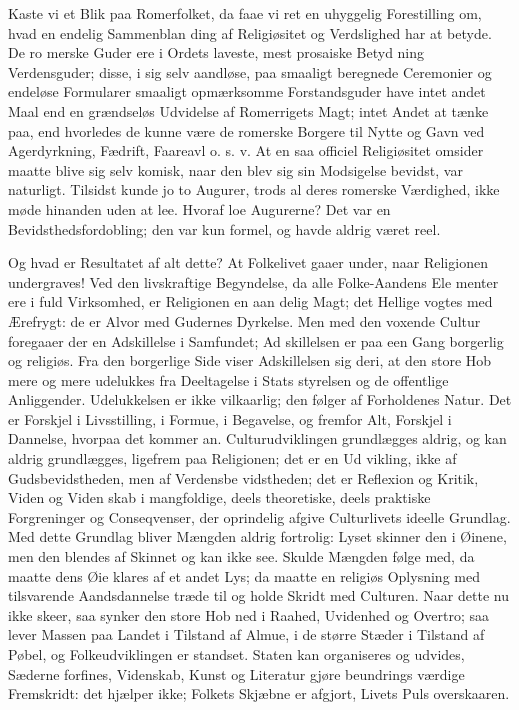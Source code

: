 \documentclass[12pt]{book}
\newcommand{\opage}[1]{\marginnote{\footnotesize\textit{[#1]}}}
\begin{document}
Kaste vi et Blik paa Romerfolket, da faae vi ret en
uhyggelig Forestilling om, hvad en endelig Sammenblan\-%
ding af Religiøsitet og Verdslighed har at betyde. De ro\-%
merske Guder ere i Ordets laveste, mest prosaiske Betyd\-%
ning Verdensguder; disse, i sig selv aandløse, paa smaaligt
beregnede Ceremonier og endeløse Formularer smaaligt
opmærksomme Forstandsguder have intet andet Maal
end en grændseløs Udvidelse af Romerrigets Magt; intet
Andet at tænke paa, end hvorledes de kunne være de
romerske Borgere til Nytte og Gavn ved Agerdyrkning,
Fædrift, Faareavl o. s. v. At en saa officiel Religiøsitet
omsider maatte blive sig selv komisk, naar den blev sig
sin Modsigelse bevidst, var naturligt. Tilsidst kunde jo
to Augurer, trods al deres romerske Værdighed, ikke
møde hinanden uden at lee. Hvoraf loe Augurerne?
Det var en Bevidsthedsfordobling; den var kun formel,
og havde aldrig været reel.

Og hvad er Resultatet af alt dette? At Folkelivet
gaaer under, naar Religionen undergraves! Ved den
livskraftige Begyndelse, da alle Folke-Aandens Ele\-%
menter ere i fuld Virksomhed, er Religionen en aan\-%
\opage{51}\setcounter{footnote}{0}%
delig Magt; det Hellige vogtes med Ærefrygt: de
er Alvor med Gudernes Dyrkelse. Men med den voxende
Cultur foregaaer der en Adskillelse i Samfundet; Ad\-%
skillelsen er paa een Gang borgerlig og religiøs. Fra den
borgerlige Side viser Adskillelsen sig deri, at den store
Hob mere og mere udelukkes fra Deeltagelse i Stats\-%
styrelsen og de offentlige Anliggender. Udelukkelsen er
ikke vilkaarlig; den følger af Forholdenes Natur. Det
er Forskjel i Livsstilling, i Formue, i Begavelse, og
fremfor Alt, Forskjel i Dannelse, hvorpaa det kommer
an. Culturudviklingen grundlægges aldrig, og kan aldrig
grundlægges, ligefrem paa Religionen; det er en Ud\-%
vikling, ikke af Gudsbevidstheden, men af Verdensbe\-%
vidstheden; det er Reflexion og Kritik, Viden og Viden\-%
skab i mangfoldige, deels theoretiske, deels praktiske
Forgreninger og Conseqvenser, der oprindelig afgive
Culturlivets ideelle Grundlag. Med dette Grundlag
bliver Mængden aldrig fortrolig: Lyset skinner den i
Øinene, men den blendes af Skinnet og kan ikke see.
Skulde Mængden følge med, da maatte dens Øie klares
af et andet Lys; da maatte en religiøs Oplysning med
tilsvarende Aandsdannelse træde til og holde Skridt med
Culturen. Naar dette nu ikke skeer, saa synker den
store Hob ned i Raahed, Uvidenhed og Overtro; saa
lever Massen paa Landet i Tilstand af Almue, i de
større Stæder i Tilstand af Pøbel, og Folkeudviklingen
er standset. Staten kan organiseres og udvides, Sæderne
forfines, Videnskab, Kunst og Literatur gjøre beundrings\-%
værdige Fremskridt: det hjælper ikke; Folkets Skjæbne
er afgjort, Livets Puls overskaaren.
\end{document}
